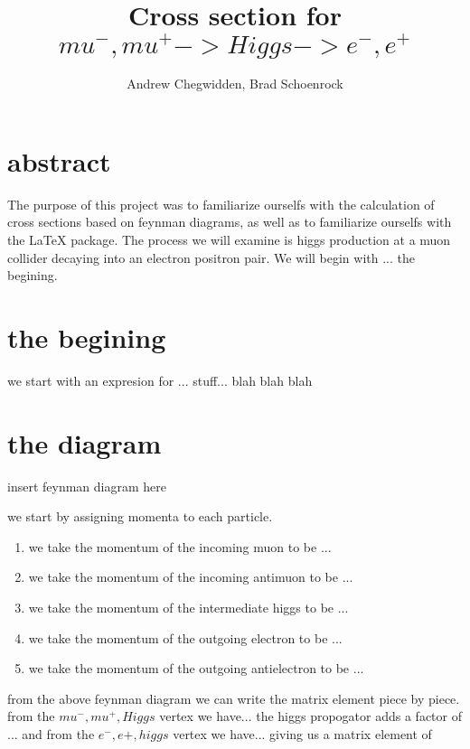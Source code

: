 \documentclass{article}
\title{Cross section for $mu^-,mu^+ ->Higgs->e^-,e^+$}
\author{Andrew Chegwidden, Brad Schoenrock}
\date{}
\begin{document}
\maketitle


\section{abstract}

The purpose of this project was to familiarize ourselfs with the calculation of cross sections based on feynman diagrams, as well as to familiarize ourselfs with the LaTeX package. The process we will examine is higgs production at a muon collider decaying into an electron positron pair. We will begin with ... the begining. 


\section{the begining}

we start with an expresion for ... 
stuff... 
blah blah blah

\section{the diagram}

insert feynman diagram here
\newline
\newline
\newline
\newline
\newline

we start by assigning momenta to each particle. 
\begin{enumerate}
\item  we take the momentum of the incoming muon to be ...
\item  we take the momentum of the incoming antimuon to be ...
\item  we take the momentum of the intermediate higgs to be ...
\item  we take the momentum of the outgoing electron to be ...
\item  we take the momentum of the outgoing antielectron to be ...
\end{enumerate}

from the above feynman diagram we can write the matrix element piece by piece. from the $mu^-,mu^+,Higgs$ vertex we have...
\newline
\newline
\newline
the higgs propogator adds a factor of ...
\newline
\newline
\newline
and from the $e^-,e+,higgs$ vertex we have...
\newline
\newline
\newline
giving us a matrix element of 
\newline
\newline
\newline
\end{document}
